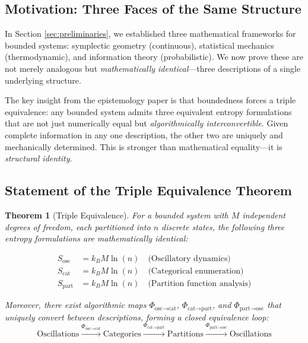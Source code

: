 \documentclass[twocolumn,10pt]{article}
\newtheorem{theorem}{Theorem}[section]
\theoremstyle{remark}
\begin{document}
\subsection{Motivation: Three Faces of the Same Structure}

In Section \ref{sec:preliminaries}, we established three mathematical frameworks for bounded systems: symplectic geometry (continuous), statistical mechanics (thermodynamic), and information theory (probabilistic). We now prove these are not merely analogous but \textit{mathematically identical}—three descriptions of a single underlying structure.

The key insight from the epistemology paper \cite{sachikonye2025epistemology} is that boundedness forces a triple equivalence: any bounded system admits three equivalent entropy formulations that are not just numerically equal but \textit{algorithmically interconvertible}. Given complete information in any one description, the other two are uniquely and mechanically determined. This is stronger than mathematical equality—it is \textit{structural identity}.

\subsection{Statement of the Triple Equivalence Theorem}

\begin{theorem}[Triple Equivalence]
\label{thm:triple_equivalence}
For a bounded system with $M$ independent degrees of freedom, each partitioned into $n$ discrete states, the following three entropy formulations are mathematically identical:

\begin{align}
    S_{\text{osc}} &= k_B M \ln(n) \quad \text{(Oscillatory dynamics)} \label{eq:S_osc} \\
    S_{\text{cat}} &= k_B M \ln(n) \quad \text{(Categorical enumeration)} \label{eq:S_cat} \\
    S_{\text{part}} &= k_B M \ln(n) \quad \text{(Partition function analysis)} \label{eq:S_part}
\end{align}

Moreover, there exist algorithmic maps $\Phi_{\text{osc} \to \text{cat}}$, $\Phi_{\text{cat} \to \text{part}}$, and $\Phi_{\text{part} \to \text{osc}}$ that uniquely convert between descriptions, forming a closed equivalence loop:
\begin{equation}
    \text{Oscillations} \xrightarrow{\Phi_{\text{osc} \to \text{cat}}} \text{Categories} \xrightarrow{\Phi_{\text{cat} \to \text{part}}} \text{Partitions} \xrightarrow{\Phi_{\text{part} \to \text{osc}}} \text{Oscillations}
    \label{eq:equivalence_loop}
\end{equation}
\end{theorem}
\end{document}
